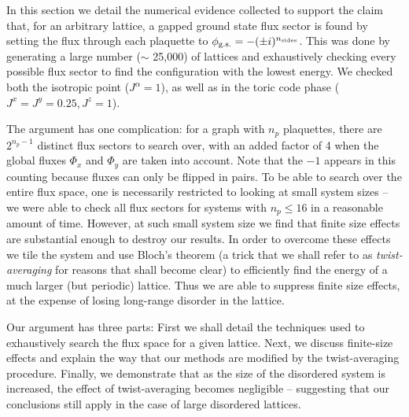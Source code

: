 \documentclass[%
 reprint,
superscriptaddress,
 amsmath,amssymb,
aps,
]{revtex4-2}
\begin{document}
In this section we detail the numerical evidence collected to support the claim that, for an arbitrary lattice, a gapped ground state flux sector is found by setting the flux through each plaquette to $\phi_{\textup{g.s.}} = -(\pm i)^{n_{\textup{sides}}}$. This was done by generating a large number ($\sim$ 25,000) of lattices and exhaustively checking every possible flux sector to find the configuration with the lowest energy. We checked both the isotropic point ($J^\alpha = 1$), as well as in the toric code phase ($J^x = J^y = 0.25, J^z = 1$).\par 
The argument has one complication: for a graph with $n_p$ plaquettes, there are $2^{n_p - 1}$ distinct flux sectors to search over, with an added factor of 4 when the global fluxes $\Phi_x$ and $\Phi_y$ are taken into account. Note that the $-1$ appears in this counting because fluxes can only be flipped in pairs. To be able to search over the entire flux space, one is necessarily restricted to looking at small system sizes -- we were able to check all flux sectors for systems with $n_p \leq 16$ in a reasonable amount of time. However, at such small system size we find that finite size effects are substantial enough to destroy our results. In order to overcome these effects we tile the system and use Bloch's theorem (a trick that we shall refer to as \textit{twist-averaging} for reasons that shall become clear) to efficiently find the energy of a much larger (but periodic) lattice. Thus we are able to suppress finite size effects, at the expense of losing long-range disorder in the lattice.\par
Our argument has three parts: First we shall detail the techniques used to exhaustively search the flux space for a given lattice. Next, we discuss finite-size effects and explain the way that our methods are modified by the twist-averaging procedure. Finally, we demonstrate that as the size of the disordered system is increased, the effect of twist-averaging becomes negligible -- suggesting that our conclusions still apply in the case of large disordered lattices. 
\end{document}
